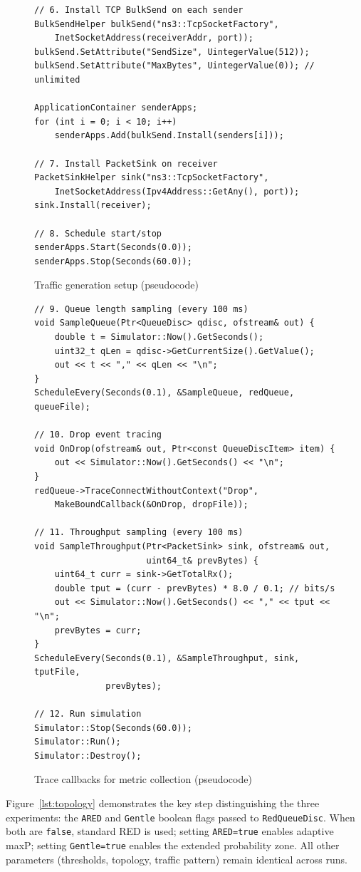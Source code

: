 \documentclass[default]{subfiles}
\begin{document}
{\begin{figure}[H]
\begin{verbatim}
// 6. Install TCP BulkSend on each sender
BulkSendHelper bulkSend("ns3::TcpSocketFactory",
    InetSocketAddress(receiverAddr, port));
bulkSend.SetAttribute("SendSize", UintegerValue(512));
bulkSend.SetAttribute("MaxBytes", UintegerValue(0)); // unlimited

ApplicationContainer senderApps;
for (int i = 0; i < 10; i++)
    senderApps.Add(bulkSend.Install(senders[i]));

// 7. Install PacketSink on receiver
PacketSinkHelper sink("ns3::TcpSocketFactory",
    InetSocketAddress(Ipv4Address::GetAny(), port));
sink.Install(receiver);

// 8. Schedule start/stop
senderApps.Start(Seconds(0.0));
senderApps.Stop(Seconds(60.0));
\end{verbatim}
\caption{Traffic generation setup (pseudocode)}
\label{lst:traffic}
\end{figure}

\begin{figure}[H]
\begin{verbatim}
// 9. Queue length sampling (every 100 ms)
void SampleQueue(Ptr<QueueDisc> qdisc, ofstream& out) {
    double t = Simulator::Now().GetSeconds();
    uint32_t qLen = qdisc->GetCurrentSize().GetValue();
    out << t << "," << qLen << "\n";
}
ScheduleEvery(Seconds(0.1), &SampleQueue, redQueue, queueFile);

// 10. Drop event tracing
void OnDrop(ofstream& out, Ptr<const QueueDiscItem> item) {
    out << Simulator::Now().GetSeconds() << "\n";
}
redQueue->TraceConnectWithoutContext("Drop",
    MakeBoundCallback(&OnDrop, dropFile));

// 11. Throughput sampling (every 100 ms)
void SampleThroughput(Ptr<PacketSink> sink, ofstream& out,
                      uint64_t& prevBytes) {
    uint64_t curr = sink->GetTotalRx();
    double tput = (curr - prevBytes) * 8.0 / 0.1; // bits/s
    out << Simulator::Now().GetSeconds() << "," << tput << "\n";
    prevBytes = curr;
}
ScheduleEvery(Seconds(0.1), &SampleThroughput, sink, tputFile,
              prevBytes);

// 12. Run simulation
Simulator::Stop(Seconds(60.0));
Simulator::Run();
Simulator::Destroy();
\end{verbatim}
\caption{Trace callbacks for metric collection (pseudocode)}
\label{lst:tracing}
\end{figure}

Figure~\ref{lst:topology} demonstrates the key step distinguishing the three experiments: the \texttt{ARED} and \texttt{Gentle} boolean flags passed to \texttt{RedQueueDisc}. When both are \texttt{false}, standard RED is used; setting \texttt{ARED=true} enables adaptive maxP; setting \texttt{Gentle=true} enables the extended probability zone. All other parameters (thresholds, topology, traffic pattern) remain identical across runs.

}
\end{document}
